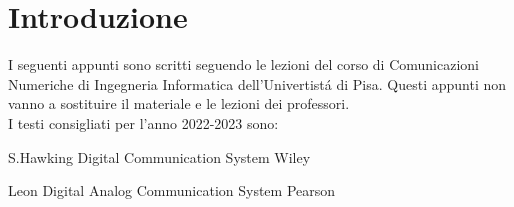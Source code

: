 \section{Introduzione}
I seguenti appunti sono scritti seguendo le lezioni del corso di Comunicazioni Numeriche 
di Ingegneria Informatica dell'Univertistá di Pisa. Questi appunti non 
vanno a sostituire il materiale e le lezioni dei professori.\\
I testi consigliati per l'anno 2022-2023 sono:

S.Hawking Digital Communication System Wiley


Leon Digital Analog Communication System Pearson

